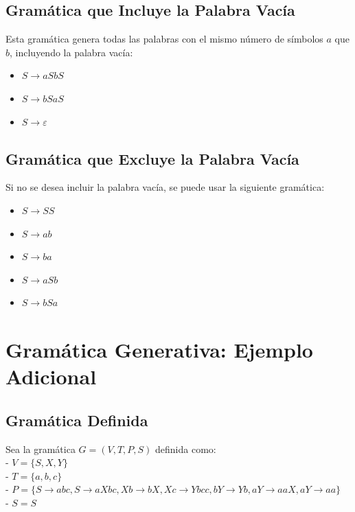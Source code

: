 \documentclass[12pt]{report} %
\providecommand{\tightlist}{%
  \setlength{\itemsep}{0pt}\setlength{\parskip}{0pt}}
\begin{document}
\hypertarget{gramuxe1tica-que-incluye-la-palabra-vacuxeda}{%
\subsection{Gramática que Incluye la Palabra
Vacía}\label{gramuxe1tica-que-incluye-la-palabra-vacuxeda}}

Esta gramática genera todas las palabras con el mismo número de símbolos
\(a\) que \(b\), incluyendo la palabra vacía:

\begin{itemize}
\tightlist
\item
  \(S \to aSbS\)
\item
  \(S \to bSaS\)
\item
  \(S \to \varepsilon\)
\end{itemize}

\hypertarget{gramuxe1tica-que-excluye-la-palabra-vacuxeda}{%
\subsection{Gramática que Excluye la Palabra
Vacía}\label{gramuxe1tica-que-excluye-la-palabra-vacuxeda}}

Si no se desea incluir la palabra vacía, se puede usar la siguiente
gramática:

\begin{itemize}
\tightlist
\item
  \(S \to SS\)
\item
  \(S \to ab\)
\item
  \(S \to ba\)
\item
  \(S \to aSb\)
\item
  \(S \to bSa\)
\end{itemize}

\hypertarget{gramuxe1tica-generativa-ejemplo-adicional}{%
\section{Gramática Generativa: Ejemplo
Adicional}\label{gramuxe1tica-generativa-ejemplo-adicional}}

\hypertarget{gramuxe1tica-definida-1}{%
\subsection{Gramática Definida}\label{gramuxe1tica-definida-1}}

Sea la gramática \(G = (V, T, P, S)\) definida como:\\
- \(V = \{S, X, Y\}\)\\
- \(T = \{a, b, c\}\)\\
-
\(P = \{  S \to abc,  S \to aXbc,  Xb \to bX,  Xc \to Ybcc,  bY \to Yb,  aY \to aaX,  aY \to aa \}\)\\
- \(S = S\)
\end{document}
